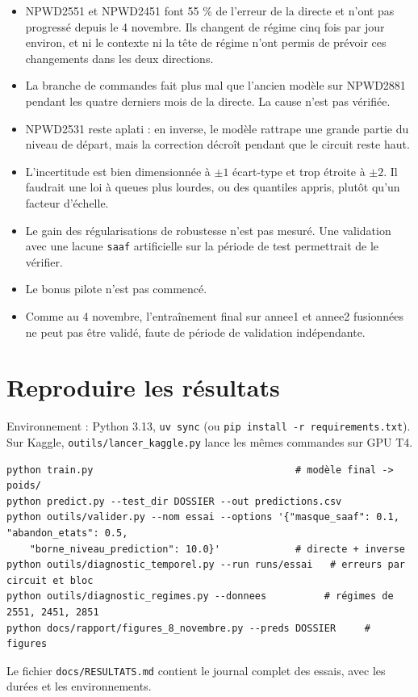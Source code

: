\documentclass[11pt,a4paper]{article}
\newcommand{\code}[1]{\texttt{#1}}
\begin{document}
\begin{itemize}
  \item NPWD2551 et NPWD2451 font 55 \% de l'erreur de la directe et n'ont pas progressé depuis le 4 novembre. Ils changent de régime cinq fois par jour environ, et ni le contexte ni la tête de régime n'ont permis de prévoir ces changements dans les deux directions.
  \item La branche de commandes fait plus mal que l'ancien modèle sur NPWD2881 pendant les quatre derniers mois de la directe. La cause n'est pas vérifiée.
  \item NPWD2531 reste aplati : en inverse, le modèle rattrape une grande partie du niveau de départ, mais la correction décroît pendant que le circuit reste haut.
  \item L'incertitude est bien dimensionnée à $\pm 1$ écart-type et trop étroite à $\pm 2$. Il faudrait une loi à queues plus lourdes, ou des quantiles appris, plutôt qu'un facteur d'échelle.
  \item Le gain des régularisations de robustesse n'est pas mesuré. Une validation avec une lacune \code{saaf} artificielle sur la période de test permettrait de le vérifier.
  \item Le bonus pilote n'est pas commencé.
  \item Comme au 4 novembre, l'entraînement final sur annee1 et annee2 fusionnées ne peut pas être validé, faute de période de validation indépendante.
\end{itemize}

\appendix
\section{Reproduire les résultats}

Environnement : Python 3.13, \code{uv sync} (ou \code{pip install -r requirements.txt}). Sur Kaggle, \code{outils/lancer\_kaggle.py} lance les mêmes commandes sur GPU T4.

\begin{small}
\begin{verbatim}
python train.py                                   # modèle final -> poids/
python predict.py --test_dir DOSSIER --out predictions.csv
python outils/valider.py --nom essai --options '{"masque_saaf": 0.1, "abandon_etats": 0.5,
    "borne_niveau_prediction": 10.0}'             # directe + inverse
python outils/diagnostic_temporel.py --run runs/essai   # erreurs par circuit et bloc
python outils/diagnostic_regimes.py --donnees          # régimes de 2551, 2451, 2851
python docs/rapport/figures_8_novembre.py --preds DOSSIER     # figures
\end{verbatim}
\end{small}

Le fichier \code{docs/RESULTATS.md} contient le journal complet des essais, avec les durées et les environnements.
\end{document}
